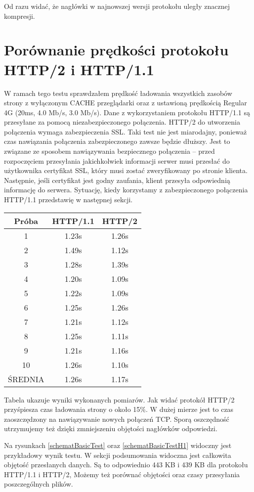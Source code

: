 \documentclass[a4paper,12pt,twoside,openany]{report}
\begin{document}
Od razu widać, że nagłówki w najnowszej wersji protokołu uległy znacznej kompresji. 

\section{Porównanie prędkości protokołu HTTP/2 i HTTP/1.1}

W ramach tego testu sprawdzałem prędkość ładowania wszystkich zasobów strony z wyłączonym CACHE przeglądarki oraz z ustawioną prędkością Regular 4G (20ms, 4.0 Mb/s, 3.0 Mb/s).
Dane z wykorzystaniem protokołu HTTP/1.1 są przesyłane za pomocą niezabezpieczonego połączenia.
HTTP/2 do utworzenia połączenia wymaga zabezpieczenia SSL.
Taki test nie jest miarodajny, ponieważ czas nawiązania połączenia zabezpieczonego zawsze będzie dłuższy.
Jest to związane ze sposobem nawiązywania bezpiecznego połączenia -- przed rozpoczęciem przesyłania jakichkolwiek informacji serwer musi przesłać do użytkownika certyfikat SSL, który musi zostać zweryfikowany po stronie klienta.
Następnie, jeśli certyfikat jest godny zaufania, klient przesyła odpowiednią informację do serwera.
Sytuację, kiedy korzystamy z zabezpieczonego połączenia HTTP/1.1 przedstawię w następnej sekcji.

\begin{tabular}{c|c|c}
Próba & HTTP/1.1 & HTTP/2 \\ \hline
1 & 1.23s & 1.26s\\
2 & 1.49s & 1.12s\\
3 & 1.28s & 1.39s\\
4 & 1.20s & 1.09s\\
5 & 1.22s & 1.09s\\
6 & 1.25s & 1.26s\\
7 & 1.21s & 1.12s\\
8 & 1.25s & 1.11s\\
9 & 1.21s & 1.16s\\
10 & 1.26s & 1.10s\\ \hline
ŚREDNIA & 1.26s & 1.17s\\
\end{tabular}

Tabela ukazuje wyniki wykonanych pomiarów.
Jak widać protokół HTTP/2 przyśpiesza czas ładowania strony o około 15\%.
W dużej mierze jest to czas zaoszczędzony na nawiązywanie nowych połączeń TCP.
Sporą oszczędność utrzymujemy też dzięki zmniejszeniu objętości nagłówków odpowiedzi.

Na rysunkach \ref{schematBasicTest} oraz \ref{schematBasicTestH1} widoczny jest przykładowy wynik testu.
W sekcji podsumowania widoczna jest całkowita objętość przesłanych danych. Są to odpowiednio 443 KB i 439 KB dla protokołu HTTP/1.1 i HTTP/2,
Możemy też porównać objętości oraz czasy przesyłania poszczególnych plików.
\end{document}
